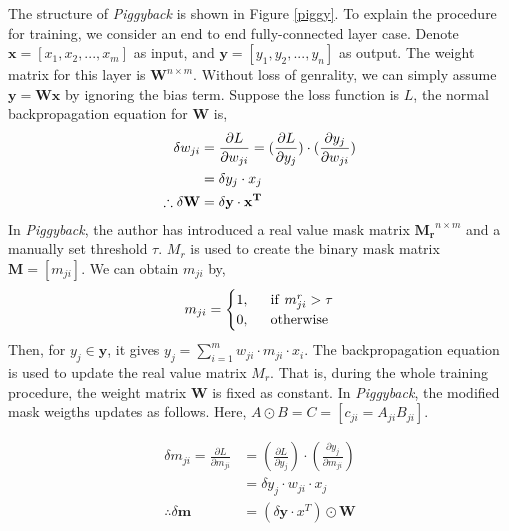 The structure of \textit{Piggyback} is shown in Figure \ref{piggy}. To explain the procedure for training, we consider an end to end fully-connected layer case. Denote $\mathbf{x}=[x_1, x_2, ..., x_m]$ as input, and $\mathbf{y}=[y_1, y_2, ..., y_n]$ as output. The weight matrix for this layer is $\mathbf{W}^{n\times m}$. Without loss of genrality, we can simply assume $\mathbf{y}=\mathbf{W}\mathbf{x}$ by ignoring the bias term. Suppose the loss function is $L$, the normal backpropagation equation for $\mathbf{W}$ is,
\begin{equation}
\centering
\begin{aligned}
\delta w_{ji}&=\frac{\partial L}{\partial w_{ji}} = (\frac{\partial L}{\partial y_j})\cdot (\frac{\partial y_j}{\partial w_{ji}}) \\
&= \delta y_j \cdot x_j \\
\therefore \delta \mathbf{W} &= \delta \mathbf{y} \cdot  \mathbf{x^T} \\
\end{aligned}
\end{equation}
In \textit{Piggyback}, the author has introduced a real value mask matrix $\mathbf{M_r}^{n\times m}$ and a manually set threshold $\tau$. $M_r$ is used to create the binary mask matrix $\mathbf{M}=[m_{ji}]$. We can obtain $m_{ji}$ by,
\begin{equation}
m_{ji}=\begin{cases}
1,\ \ &{\rm if}\ m^r_{ji}>\tau \\
0,\ \ &{\rm otherwise} \\
\end{cases}
\end{equation}
Then, for $y_j\in\mathbf{y}$, it gives $y_j=\sum_{i=1}^m w_{ji}\cdot m_{ji} \cdot x_i$. The backpropagation equation is used to update the real value matrix $M_r$. That is, during the whole training procedure, the weight matrix $\mathbf{W}$ is fixed as constant. In \textit{Piggyback}, the modified mask weigths updates as follows. Here, $A\odot B = C=[c_{ji}=A_{ji}B_{ji}]$. 

\begin{equation}
\begin{aligned}
\delta m_{ji}=\frac{\partial L}{\partial m_{ji}} &= (\frac{\partial L}{\partial y_j})\cdot (\frac{\partial y_j}{\partial m_{ji}}) \\
&= \delta y_j \cdot w_{ji} \cdot x_j \\
\therefore \delta \mathbf{m} &= (\delta \mathbf{y} \cdot x^T) \odot \mathbf{W} \\
\end{aligned}
\end{equation}
